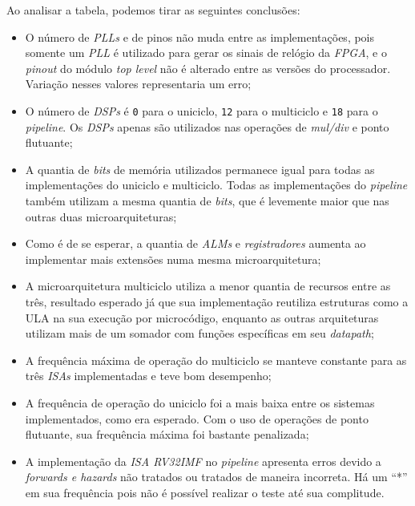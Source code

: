    { Ao analisar a tabela, podemos tirar as seguintes conclusões: }
    \begin{itemize}
        \item   O número de \textit{PLLs} e de pinos não muda entre as implementações,
            pois somente um \textit{PLL} é utilizado para gerar os sinais de relógio da
            \textit{FPGA}, e o \textit{pinout} do módulo \textit{top level} não é alterado
            entre as versões do processador. Variação nesses valores representaria um erro;
        \item   O número de \textit{DSPs} é \texttt{0} para o uniciclo, \texttt{12} para o
            multiciclo e \texttt{18} para o \textit{pipeline}. Os \textit{DSPs} apenas
            são utilizados nas operações de \textit{mul/div} e ponto flutuante;
        \item   A quantia de \textit{bits} de memória utilizados permanece igual para
            todas as implementações do uniciclo e multiciclo. Todas as implementações
            do \textit{pipeline} também utilizam a mesma quantia de \textit{bits}, que
            é levemente maior que nas outras duas microarquiteturas;
        \item   Como é de se esperar, a quantia de \textit{ALMs} e \textit{registradores}
            aumenta ao implementar mais extensões numa mesma microarquitetura;
        \item   A microarquitetura multiciclo utiliza a menor quantia de recursos entre
            as três, resultado esperado já que sua implementação reutiliza estruturas como
            a ULA na sua execução por microcódigo, enquanto as outras arquiteturas utilizam
            mais de um somador com funções específicas em seu \textit{datapath};
        \item   A frequência máxima de operação do multiciclo se manteve constante para as
            três \textit{ISAs} implementadas e teve bom desempenho;
        \item   A frequência de operação do uniciclo foi a mais baixa entre os sistemas
            implementados, como era esperado. Com o uso de operações de ponto flutuante,
            sua frequência máxima foi bastante penalizada;
        \item   A implementação da \textit{ISA RV32IMF} no \textit{pipeline} apresenta
            erros devido a \textit{forwards e hazards} não tratados ou tratados de maneira
            incorreta. Há um ``*'' em sua frequência pois não é possível realizar o teste
            até sua complitude.
    \end{itemize}


